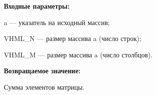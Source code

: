 \textbf{Входные параметры:}

 a --- указатель на исходный массив;
 
 VHML\_N --- размер массива a (число строк);
 
 VHML\_M --- размер массива a (число столбцов).

\textbf{Возвращаемое значение:}

 Сумма элементов матрицы.